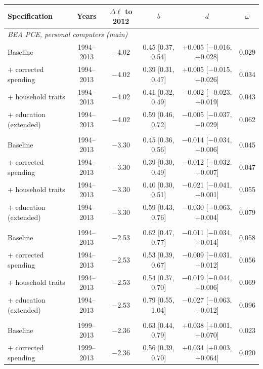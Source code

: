 \footnotesize
\begin{tabular}{lccccc}
\toprule
Specification & Years & $\Delta\ell$ to 2012 & $b$ & $d$ & $\omega$ \\
\midrule
\multicolumn{6}{l}{\textit{BEA PCE, personal computers (main)}} \\
Baseline & 1994--2013 & $-$4.02 & 0.45 [0.37, 0.54] & +0.005 [$-$0.016, +0.028] & 0.029 \\
+ corrected spending & 1994--2013 & $-$4.02 & 0.39 [0.31, 0.47] & +0.005 [$-$0.015, +0.026] & 0.034 \\
+ household traits & 1994--2013 & $-$4.02 & 0.41 [0.32, 0.49] & $-$0.002 [$-$0.023, +0.019] & 0.043 \\
+ education (extended) & 1994--2013 & $-$4.02 & 0.59 [0.46, 0.72] & $-$0.005 [$-$0.037, +0.029] & 0.062 \\
\addlinespace
\multicolumn{6}{l}{\textit{BEA PCE, information processing equipment}} \\
Baseline & 1994--2013 & $-$3.30 & 0.45 [0.36, 0.56] & $-$0.014 [$-$0.034, +0.006] & 0.045 \\
+ corrected spending & 1994--2013 & $-$3.30 & 0.39 [0.30, 0.49] & $-$0.012 [$-$0.032, +0.007] & 0.047 \\
+ household traits & 1994--2013 & $-$3.30 & 0.40 [0.30, 0.51] & $-$0.021 [$-$0.041, $-$0.001] & 0.055 \\
+ education (extended) & 1994--2013 & $-$3.30 & 0.59 [0.43, 0.76] & $-$0.030 [$-$0.063, +0.004] & 0.079 \\
\addlinespace
\multicolumn{6}{l}{\textit{BEA investment, computers}} \\
Baseline & 1994--2013 & $-$2.53 & 0.62 [0.47, 0.77] & $-$0.011 [$-$0.034, +0.014] & 0.058 \\
+ corrected spending & 1994--2013 & $-$2.53 & 0.53 [0.39, 0.67] & $-$0.009 [$-$0.031, +0.012] & 0.056 \\
+ household traits & 1994--2013 & $-$2.53 & 0.54 [0.37, 0.70] & $-$0.019 [$-$0.044, +0.006] & 0.069 \\
+ education (extended) & 1994--2013 & $-$2.53 & 0.79 [0.55, 1.04] & $-$0.027 [$-$0.063, +0.012] & 0.096 \\
\addlinespace
\multicolumn{6}{l}{\textit{BLS CPI-U, personal computers}} \\
Baseline & 1999--2013 & $-$2.36 & 0.63 [0.44, 0.79] & +0.038 [+0.001, +0.070] & 0.023 \\
+ corrected spending & 1999--2013 & $-$2.36 & 0.56 [0.39, 0.70] & +0.034 [+0.003, +0.064] & 0.020 \\

\end{tabular}
